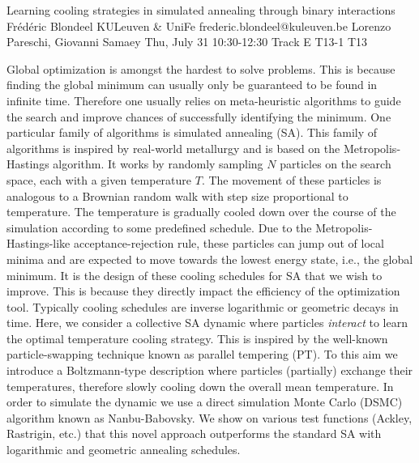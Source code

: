 \begin{talk}
  {Learning cooling strategies in simulated annealing through binary interactions}%
  {Frédéric Blondeel}%
  {KULeuven \& UniFe}%
  {frederic.blondeel@kuleuven.be}%
  {Lorenzo Pareschi, Giovanni Samaey}%
  {}%
  {Thu, July 31 10:30-12:30 Track E}%
  {T13-1}%
  {T13}%
			
Global optimization is amongst the hardest to solve problems. This is because finding the global minimum can usually only be guaranteed to be found in infinite time. Therefore one usually relies on meta-heuristic algorithms to guide the search and improve chances of successfully identifying the minimum. One particular family of algorithms is simulated annealing (SA). This family of algorithms is inspired by real-world metallurgy and is based on the Metropolis-Hastings algorithm. It works by randomly sampling $N$ particles on the search space, each with a given temperature $T$. The movement of these particles is analogous to a Brownian random walk with step size proportional to temperature. The temperature is gradually cooled down over the course of the simulation according to some predefined schedule. Due to the Metropolis-Hastings-like acceptance-rejection rule, these particles can jump out of local minima and are expected to move towards the lowest energy state, i.e., the global minimum. It is the design of these cooling schedules for SA that we wish to improve. This is because they directly impact the efficiency of the optimization tool. Typically cooling schedules are inverse logarithmic or geometric decays in time. Here, we consider a collective SA dynamic where particles \textit{interact} to learn the optimal temperature cooling strategy. This is inspired by the well-known particle-swapping technique known as parallel tempering (PT). To this aim we introduce a Boltzmann-type description where particles (partially) exchange their temperatures, therefore slowly cooling down the overall mean temperature. In order to simulate the dynamic we use a direct simulation Monte Carlo (DSMC) algorithm known as Nanbu-Babovsky. We show on various test functions (Ackley, Rastrigin, etc.) that this novel approach outperforms the standard SA with logarithmic and geometric annealing schedules.

\end{talk}
